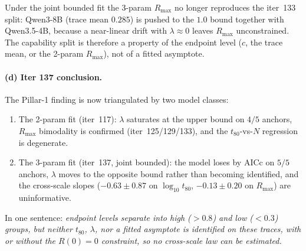 Under the joint bounded fit the 3-param $R_{\max}$ no longer
reproduces the iter~133 split: Qwen3-8B (trace mean $0.285$) is pushed
to the $1.0$ bound together with Qwen3.5-4B, because a near-linear
drift with $\lambda \approx 0$ leaves $R_{\max}$ unconstrained.  The
capability split is therefore a property of the endpoint level
($c$, the trace mean, or the 2-param $R_{\max}$), not of a fitted
asymptote.

\paragraph{(d) Iter 137 conclusion.}
\label{par:scaling-iter137-conclusion}

The Pillar-1 finding is now triangulated by two model classes:
\begin{enumerate}
  \item The 2-param fit (iter~117): $\lambda$ saturates at the
    upper bound on $4/5$ anchors, $R_{\max}$ bimodality is
    confirmed (iter~125/129/133), and the $t_{80}$-vs-$N$
    regression is degenerate.
  \item The 3-param fit (iter~137, joint bounded): the model loses
    by AICc on $5/5$ anchors, $\lambda$ moves to the opposite bound
    rather than becoming identified, and the cross-scale slopes
    ($-0.63 \pm 0.87$ on $\log_{10} t_{80}$, $-0.13 \pm 0.20$ on
    $R_{\max}$) are uninformative.
\end{enumerate}
In one sentence: \emph{endpoint levels separate into high
($>0.8$) and low ($<0.3$) groups, but neither $t_{80}$, $\lambda$,
nor a fitted asymptote is identified on these traces, with or
without the $R(0)=0$ constraint, so no cross-scale law can be
estimated.}

